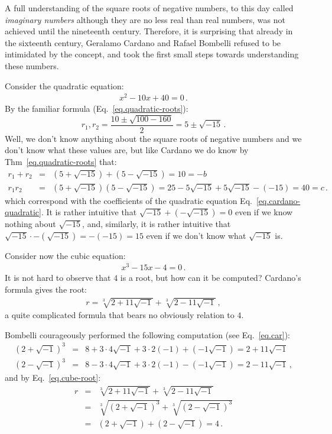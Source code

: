 A full understanding of the square roots of negative numbers, to this day called \emph{imaginary numbers} although they are no less real than real numbers, was not achieved until the nineteenth century. Therefore, it is surprising that already in the sixteenth century, Geralamo Cardano and Rafael Bombelli refused to be intimidated by the concept, and took the first small steps towards understanding these numbers.

Consider the quadratic equation:
\begin{align}
x^2-10x+40=0\,.\label{eq.cardano-quadratic}
\end{align}
By the familiar formula (Eq.~\ref{eq.quadratic-roots}):
\[
r_1, r_2=\displaystyle\frac{10\pm\sqrt{100-160}}{2}=5\pm\sqrt{-15}\,.
\]
Well, we don't know anything about the square roots of negative numbers and we don't know what these values are, but like Cardano we do know by Thm~\ref{eq.quadratic-roots} that:
\[
\begin{array}{lcl}
r_1+r_2&=&(5+\sqrt{-15})+(5-\sqrt{-15})=10=-b\\
r_1r_2&=&(5+\sqrt{-15})(5-\sqrt{-15})=25-5\sqrt{-15}+5\sqrt{-15}-(-15)=40=c\,.
\end{array}
\]
which correspond with the coefficients of the quadratic equation Eq.~\ref{eq.cardano-quadratic}. It is rather intuitive that $\sqrt{-15}+(-\sqrt{-15})=0$ even if we know nothing about $\sqrt{-15}$, and, similarly, it is rather intuitive that $\sqrt{-15}\cdot-(\sqrt{-15})=-(-15)=15$ even if we don't know what $\sqrt{-15}$ is.

\enlargethispage{\baselineskip}

Consider now the cubic equation:
\begin{align}
x^3-15x-4=0\,.\label{eq.bombelli-cubic}
\end{align}
It is not hard to observe that $4$ is a root, but how can it be computed? Cardano's formula gives the root:
\begin{align}
r=\sqrt[3]{2+11\sqrt{-1}}+\sqrt[3]{2-11\sqrt{-1}}\,,\label{eq.cube-root}
\end{align}
a quite complicated formula that bears no obviously relation to $4$. 

Bombelli courageously performed the following computation (see Eq.~\ref{eq.car}):
\begin{eqnarray*}
(2+\sqrt{-1})^3&=&
8+3\cdot 4\sqrt{-1}+3\cdot 2(-1)+(-1\sqrt{-1})=
2+11\sqrt{-1}\\
(2-\sqrt{-1})^3&=&
8-3\cdot 4\sqrt{-1}+3\cdot 2(-1)-(-1\sqrt{-1})=
2-11\sqrt{-1}\,,
\end{eqnarray*}
and by Eq.~\ref{eq.cube-root}:
\begin{eqnarray*}
r&=&\sqrt[3]{2+11\sqrt{-1}} + \sqrt[3]{2-11\sqrt{-1}}\\
&=&\sqrt[3]{(2+\sqrt{-1})^3} + \sqrt[3]{(2-\sqrt{-1})^3}\\
&=&(2+\sqrt{-1}) + (2-\sqrt{-1})=4\,.
\end{eqnarray*}


